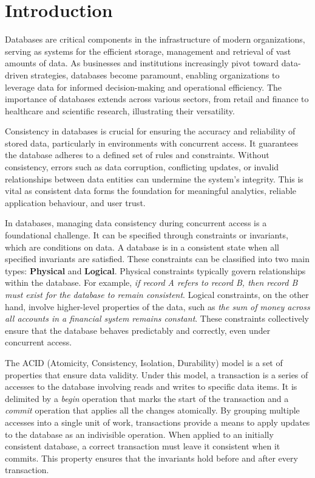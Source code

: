 %



\chapter{Introduction} \label{chap:intro}
\adjustmtc

Databases are critical components in the infrastructure of modern organizations, serving as systems for the efficient storage, management and retrieval of vast amounts of data. As businesses and institutions increasingly pivot toward data-driven strategies, databases become paramount, enabling organizations to leverage data for informed decision-making and operational efficiency. The importance of databases extends across various sectors, from retail and finance to healthcare and scientific research, illustrating their versatility.


Consistency in databases is crucial for ensuring the accuracy and reliability of stored data, particularly in environments with concurrent access. It guarantees the database adheres to a defined set of rules and constraints. Without consistency, errors such as data corruption, conflicting updates, or invalid relationships between data entities can undermine the system's integrity. This is vital as consistent data forms the foundation for meaningful analytics, reliable application behaviour, and user trust.

In databases, managing data consistency during concurrent access is a foundational challenge. It can be specified through constraints or invariants, which are conditions on data. A database is in a consistent state when all specified invariants are satisfied. These constraints can be classified into two main types: \textbf{Physical} and \textbf{Logical}. Physical constraints typically govern relationships within the database. For example, \emph{if record A refers to record B, then record B must exist for the database to remain consistent}. Logical constraints, on the other hand, involve higher-level properties of the data, such as \emph{the sum of money across all accounts in a financial system remains constant}. These constraints collectively ensure that the database behaves predictably and correctly, even under concurrent access.

The ACID (Atomicity, Consistency, Isolation, Durability) model is a set of properties that ensure data validity. Under this model, a transaction is a series of accesses to the database involving reads and writes to specific data items. It is delimited by a \emph{begin} operation that marks the start of the transaction and a \emph{commit} operation that applies all the changes atomically. By grouping multiple accesses into a single unit of work, transactions provide a means to apply updates to the database as an indivisible operation. When applied to an initially consistent database, a correct transaction must leave it consistent when it commits. This property ensures that the invariants hold before and after every transaction.

